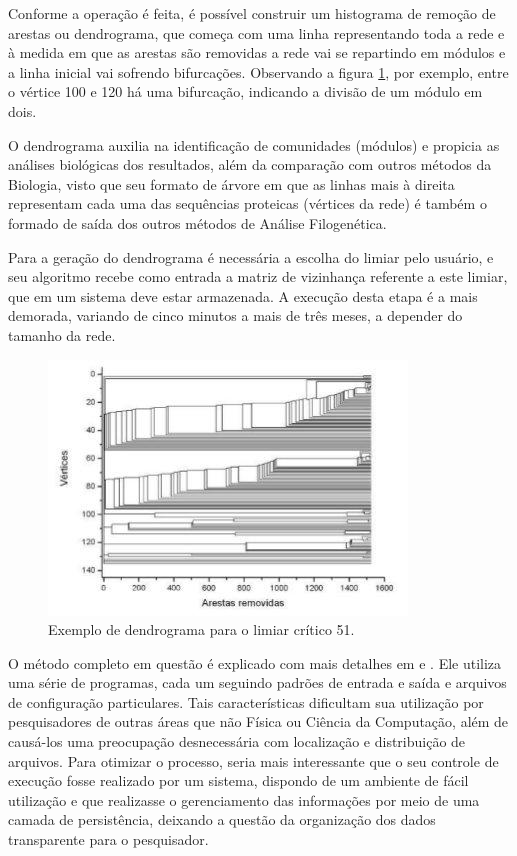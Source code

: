 Conforme a operação é feita, é possível construir um histograma de remoção de arestas ou dendrograma, que começa com uma linha representando toda a rede
e à medida em que as arestas são removidas a rede vai se repartindo em módulos e a linha inicial vai sofrendo bifurcações. Observando a figura
\ref{fig:dendrograma}, por exemplo, entre o vértice 100 e 120 há uma bifurcação, indicando a divisão de um módulo em dois.

O dendrograma auxilia na identificação de comunidades (módulos) e propicia as análises biológicas dos resultados, além da comparação com outros
métodos da Biologia, visto que seu formato de árvore em que as linhas mais à direita representam cada uma das sequências proteicas (vértices da rede)
é também o formado de saída dos outros métodos de Análise Filogenética. 

Para a geração do dendrograma é necessária a escolha do limiar pelo usuário, e seu algoritmo recebe como entrada a matriz de vizinhança referente a este
limiar, que em um sistema deve estar armazenada. A execução desta etapa é a mais demorada, variando de cinco minutos a mais de três meses, a depender do
tamanho da rede. 

\begin{figure}
\centering
\includegraphics[scale=0.73]{dendrograma}
\caption{Exemplo de dendrograma para o limiar crítico 51.}
\label{fig:dendrograma}
\end{figure}

O método completo em questão é explicado com mais detalhes em \cite{goesneto2010} e \cite{andrade2011}. Ele utiliza uma série de programas, cada um
seguindo padrões de entrada e saída e arquivos de configuração particulares. Tais características dificultam sua utilização por pesquisadores de outras
áreas que não Física ou Ciência da Computação, além de causá-los uma preocupação desnecessária com localização e distribuição de arquivos. Para otimizar
o processo, seria mais interessante que o seu controle de execução fosse realizado por um sistema, dispondo de um ambiente de fácil utilização e que
realizasse o gerenciamento das informações por meio de uma camada de persistência, deixando a questão da organização dos dados transparente para o
pesquisador.

